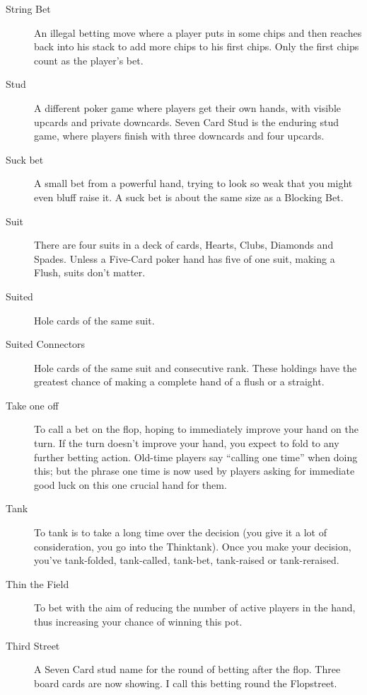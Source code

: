 \begin{description}
\item[String Bet] An illegal betting move where a player puts in some
chips and then reaches back into his stack to add more chips to his
first chips. Only the first chips count as the player's bet.

\item[Stud] A different poker game where players get their own hands,
with visible upcards and private downcards. Seven Card Stud is the
enduring stud game, where players finish with three downcards and four
upcards.

\item[Suck bet] A small bet from a powerful hand, trying to look so
weak that you might even bluff raise it. A suck bet is about the same
size as a Blocking Bet.

\item[Suit] There are four suits in a deck of cards, Hearts, Clubs,
Diamonds and Spades. Unless a Five-Card poker hand has five of one
suit, making a Flush, suits don't matter.

\item[Suited] Hole cards of the same suit.

\item[Suited Connectors] Hole cards of the same suit and consecutive
rank. These holdings have the greatest chance of making a complete hand of
a flush or a straight.

\item[Take one off] To call a bet on the flop, hoping to immediately
improve your hand on the turn. If the turn doesn't improve your hand,
you expect to fold to any further betting action. Old-time players say
``calling one time'' when doing this; but the phrase one time is now
used by players asking for immediate good luck on this one crucial
hand for them.

\item[Tank] To tank is to take a long time over the decision
(you give it a lot of consideration, you go into the Thinktank).
Once you make your decision, you've tank-folded, tank-called, tank-bet,
tank-raised or tank-reraised.

\item[Thin the Field] To bet with the aim of reducing the number of
active players in the hand, thus increasing your chance of winning
this pot.

\item[Third Street] A Seven Card stud name for the round of betting
after the flop. Three board cards are now showing. I call this betting
round the Flopstreet.


\end{description}
